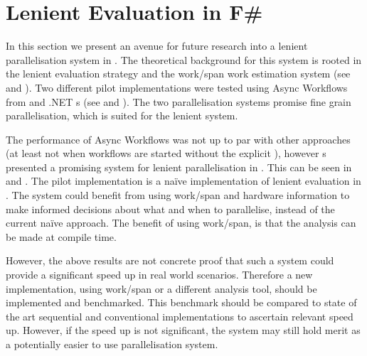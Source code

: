 \section{Lenient Evaluation in F\#}
In this section we present an avenue for future research into a lenient parallelisation system in \fs. The theoretical background for this system is rooted in the lenient evaluation strategy and the work/span work estimation system (see  and ). Two different pilot implementations were tested using Async Workflows from \fs and .NET s (see  and ). The two parallelisation systems promise fine grain parallelisation, which is suited for the lenient system.

The performance of Async Workflows was not up to par with other approaches (at least not when workflows are started without the explicit ), however s presented a promising system for lenient parallelisation in \fs. This can be seen in  and . The pilot implementation is a naïve implementation of lenient evaluation in \fs. The system could benefit from using work/span and hardware information to make informed decisions about what and when to parallelise, instead of the current naïve approach. The benefit of using work/span, is that the analysis can be made at compile time.

However, the above results are not concrete proof that such a system could provide a significant speed up in real world scenarios. Therefore a new implementation, using work/span or a different analysis tool, should be implemented and benchmarked. This benchmark should be compared to state of the art sequential and conventional implementations to ascertain relevant speed up. However, if the speed up is not significant, the system may still hold merit as a potentially easier to use parallelisation system.
